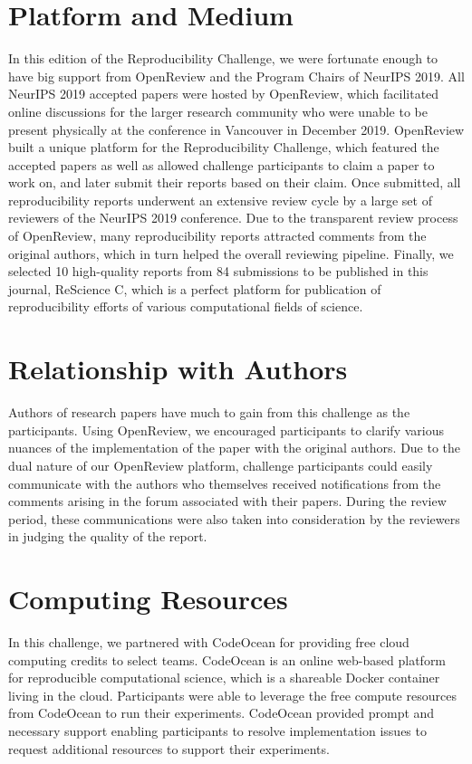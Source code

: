 \section{Platform and Medium} 

In this edition of the Reproducibility Challenge, we were fortunate enough to have big support from OpenReview and the Program Chairs of NeurIPS 2019. All NeurIPS 2019 accepted papers were hosted by OpenReview, which facilitated online discussions for the larger research community who were unable to be present physically at the conference in Vancouver in December 2019. OpenReview built a unique platform for the Reproducibility Challenge, which featured the accepted papers as well as allowed challenge participants to claim a paper to work on, and later submit their reports based on their claim. Once submitted, all reproducibility reports underwent an extensive review cycle by a large set of reviewers of the NeurIPS 2019 conference. Due to the transparent review process of OpenReview, many reproducibility reports attracted comments from the original authors, which in turn helped the overall reviewing pipeline. Finally, we selected 10 high-quality reports from 84 submissions to be published in this journal, ReScience C, which is a perfect platform for publication of reproducibility efforts of various computational fields of science.

\section{Relationship with Authors}

Authors of research papers have much to gain from this challenge as the participants. Using OpenReview, we encouraged participants to clarify various nuances of the implementation of the paper with the original authors. Due to the dual nature of our OpenReview platform, challenge participants could easily communicate with the authors who themselves received notifications from the comments arising in the forum associated with their papers. During the review period, these communications were also taken into consideration by the reviewers in judging the quality of the report.

\section{Computing Resources} 

In this challenge, we partnered with CodeOcean for providing free cloud computing credits to select teams. CodeOcean is an online web-based platform for reproducible computational science, which is a shareable Docker container living in the cloud. Participants were able to leverage the free compute resources from CodeOcean to run their experiments. CodeOcean provided prompt and necessary support enabling participants to resolve implementation issues to request additional resources to support their experiments.

